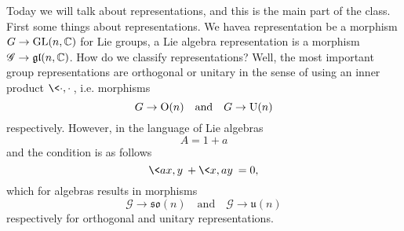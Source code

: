 Today we will talk about representations, and this is the main
part of the class. First some things about representations. We
havea representation be a morphism $G\to{\rm GL}(n,\Bbb{C})$ for Lie
groups, a Lie algebra representation is a morphism
$\mathscr{G}\to\mathfrak{gl}(n,\Bbb{C})$. How do we classify
representations? Well, the most important group representations
are orthogonal or unitary in the sense of using an inner product
$\<\cdot,\cdot\>$, i.e. morphisms
\begin{equation}
G\to{\rm O}(n)\quad\mbox{and}\quad G\to{\rm U}(n)
\end{equation}
respectively. However, in the language of Lie algebras
\begin{equation}
A = 1 + a
\end{equation}
and the condition is as follows
\begin{equation}
\<ax,y\>+\<x,ay\>=0,
\end{equation}
which for algebras results in morphisms
\begin{equation}
\mathscr{G}\to\mathfrak{so}(n)\quad\mbox{and}\quad\mathscr{G}\to\mathfrak{u}(n)
\end{equation}
respectively for orthogonal and unitary representations.

